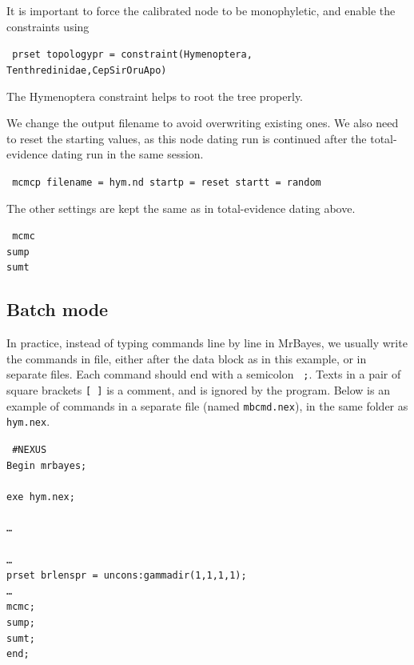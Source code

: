 \documentclass[12pt]{article}
\begin{document}
It is important to force the calibrated node to be monophyletic, and enable the constraints using

\medskip
{\tt \color{red} \noindent
prset topologypr = constraint(Hymenoptera,  \\
\hspace*{5cm} Tenthredinidae,CepSirOruApo)
}
\medskip

\noindent The Hymenoptera constraint helps to root the tree properly.

We change the output filename to avoid overwriting existing ones.
We also need to reset the starting values, as this node dating run is continued after the total-evidence dating run in the same session.

\medskip
{\tt \color{red} \noindent
mcmcp filename = hym.nd startp = reset startt = random
}
\medskip

\noindent The other settings are kept the same as in total-evidence dating above.

\medskip
{\tt \color{red} \noindent
mcmc  \\
sump  \\
sumt
}
\medskip

\subsection{Batch mode}

In practice, instead of typing commands line by line in MrBayes, we usually write the commands in file, either after the data block as in this example, or in separate files.
Each command should end with a semicolon {\tt \color{red} ;}.
Texts in a pair of square brackets {\tt [ ]} is a comment, and is ignored by the program.
Below is an example of commands in a separate file (named {\tt mbcmd.nex}), in the same folder as {\tt hym.nex}.

\medskip
{\tt \noindent
\#NEXUS        \\
Begin mrbayes; \\
 \\
\indent exe hym.nex; \\
 \\
\indent \dots  \\
 \\
\indent \dots  \\
\indent prset brlenspr = uncons:gammadir(1,1,1,1); \\
\indent \dots  \\
\indent mcmc;  \\
\indent sump;  \\
\indent sumt;  \\
end;
}
\medskip
\end{document}
